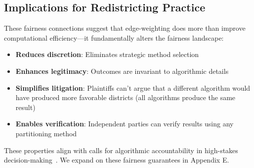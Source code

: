 \subsection{Implications for Redistricting Practice}

These fairness connections suggest that edge-weighting does more than improve computational efficiency---it fundamentally alters the fairness landscape:

\begin{itemize}
    \item \textbf{Reduces discretion}: Eliminates strategic method selection
    \item \textbf{Enhances legitimacy}: Outcomes are invariant to algorithmic details
    \item \textbf{Simplifies litigation}: Plaintiffs can't argue that a different algorithm would have produced more favorable districts (all algorithms produce the same result)
    \item \textbf{Enables verification}: Independent parties can verify results using any partitioning method
\end{itemize}

These properties align with calls for algorithmic accountability in high-stakes decision-making~\cite{kroll2017accountable,diakopoulos2016accountability}. We expand on these fairness guarantees in Appendix E.
